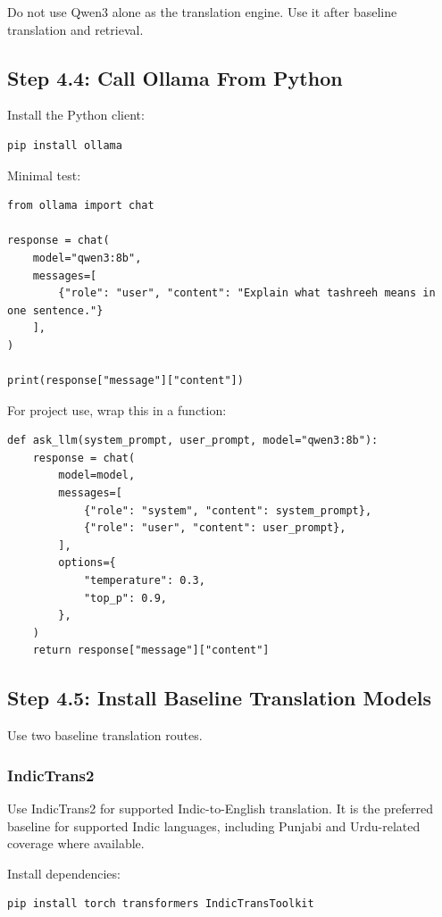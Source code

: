 \documentclass[11pt]{article}
\begin{document}
Do not use Qwen3 alone as the translation engine. Use it after baseline
translation and retrieval.

\subsection{Step 4.4: Call Ollama From Python}

Install the Python client:

\begin{verbatim}
pip install ollama
\end{verbatim}

Minimal test:

\begin{verbatim}
from ollama import chat

response = chat(
    model="qwen3:8b",
    messages=[
        {"role": "user", "content": "Explain what tashreeh means in one sentence."}
    ],
)

print(response["message"]["content"])
\end{verbatim}

For project use, wrap this in a function:

\begin{verbatim}
def ask_llm(system_prompt, user_prompt, model="qwen3:8b"):
    response = chat(
        model=model,
        messages=[
            {"role": "system", "content": system_prompt},
            {"role": "user", "content": user_prompt},
        ],
        options={
            "temperature": 0.3,
            "top_p": 0.9,
        },
    )
    return response["message"]["content"]
\end{verbatim}

\subsection{Step 4.5: Install Baseline Translation Models}

Use two baseline translation routes.

\subsubsection{IndicTrans2}

Use IndicTrans2 for supported Indic-to-English translation. It is the preferred
baseline for supported Indic languages, including Punjabi and Urdu-related
coverage where available.

Install dependencies:

\begin{verbatim}
pip install torch transformers IndicTransToolkit
\end{verbatim}
\end{document}
